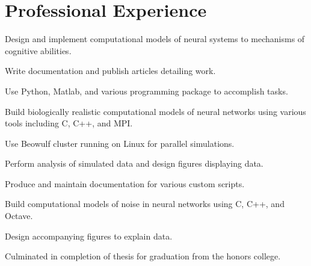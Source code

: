 \documentclass[]{deedy-resume-openfont}
\begin{document}
\begin{minipage}[t]{0.63\textwidth} 


\section{Professional Experience}

\vspace{\topsep} %
\begin{tightemize}
	\regdescript
	\item Design and implement computational models of neural systems to mechanisms of cognitive abilities.\\
	\item Write documentation and publish articles detailing work.\\
	\item Use Python, Matlab, and various programming package to accomplish tasks.\\
\end{tightemize}
\sectionsep

\begin{tightemize}
	\regdescript
	\item Build biologically realistic computational models of neural networks using various tools including C, C++, and MPI.
	\item Use Beowulf cluster running on Linux for parallel simulations.
	\item Perform analysis of simulated data and design figures displaying data.
	\item Produce and maintain documentation for various custom scripts.
\end{tightemize}
\sectionsep

\begin{tightemize}
	\regdescript
	\item Build computational models of noise in neural networks using C, C++, and Octave.\\
	\item Design accompanying figures to explain data.\\
	\item Culminated in completion of thesis for graduation from the honors college.\\
\end{tightemize}
\sectionsep


\end{minipage}
\end{document}
